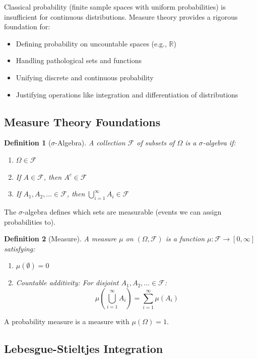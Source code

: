\documentclass[12pt,a4paper]{article}
\newtheorem{definition}{Definition}
\begin{document}
Classical probability (finite sample spaces with uniform probabilities) is insufficient for continuous distributions. Measure theory provides a rigorous foundation for:
\begin{itemize}
\item Defining probability on uncountable spaces (e.g., $\mathbb{R}$)
\item Handling pathological sets and functions
\item Unifying discrete and continuous probability
\item Justifying operations like integration and differentiation of distributions
\end{itemize}

\subsection{Measure Theory Foundations}

\begin{definition}[$\sigma$-Algebra]
A collection $\mathcal{F}$ of subsets of $\Omega$ is a $\sigma$-algebra if:
\begin{enumerate}
\item $\Omega \in \mathcal{F}$
\item If $A \in \mathcal{F}$, then $A^c \in \mathcal{F}$
\item If $A_1, A_2, \ldots \in \mathcal{F}$, then $\bigcup_{i=1}^\infty A_i \in \mathcal{F}$
\end{enumerate}
\end{definition}

The $\sigma$-algebra defines which sets are measurable (events we can assign probabilities to).

\begin{definition}[Measure]
A measure $\mu$ on $(\Omega, \mathcal{F})$ is a function $\mu: \mathcal{F} \to [0, \infty]$ satisfying:
\begin{enumerate}
\item $\mu(\emptyset) = 0$
\item Countable additivity: For disjoint $A_1, A_2, \ldots \in \mathcal{F}$:
$$\mu\left(\bigcup_{i=1}^\infty A_i\right) = \sum_{i=1}^\infty \mu(A_i)$$
\end{enumerate}
\end{definition}

A probability measure is a measure with $\mu(\Omega) = 1$.

\subsection{Lebesgue-Stieltjes Integration}
\end{document}
